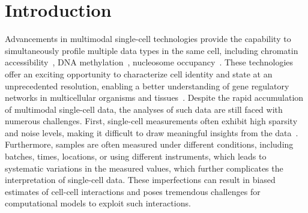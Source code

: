 \section{Introduction}
\iffalse
Advancements in multimodal single-cell technologies provide the capability to simultaneously profile multiple data types in the same cell, including chromatin accessibility~\cite{cao2018joint, chen2019high}, DNA methylation~\cite{gaiti2019epigenetic}, nucleosome occupancy~\cite{pott2017simultaneous}. For example, CITE-seq~\cite{stoeckius2017simultaneous} utilizing oligonucleotide-conjugated antibodies can quantify RNA and surface protein abundance in the same cells. Here, protein abundance is measured via the antibody-derived tags (ADTs) read counts. The Single Cell Multiome ATAC $+$ Gene Expression technology~\cite{belhocine2021single} %
concurrently profiles assay of transposase-accessible chromatin (ATAC-seq) ~\cite{buenrostro2013transposition} and RNA expression from the same cell. These technologies offer an exciting opportunity to characterize cell identity and state at an unprecedented resolution, enabling a better understanding of gene regulatory networks in multicellular organisms and tissues~\cite{zhu2020single}. 
\fi 

Advancements in multimodal single-cell technologies provide the capability to simultaneously profile multiple data types in the same cell, including chromatin accessibility~\cite{cao2018joint, chen2019high}, DNA methylation~\cite{gaiti2019epigenetic}, nucleosome occupancy~\cite{pott2017simultaneous}. These technologies offer an exciting opportunity to characterize cell identity and state at an unprecedented resolution, enabling a better understanding of gene regulatory networks in multicellular organisms and tissues~\cite{zhu2020single}.  Despite the rapid accumulation of multimodal single-cell data, the analyses of such data are still faced with numerous challenges. First, single-cell measurements often exhibit high sparsity and noise levels, making it difficult to draw meaningful insights from the data~\cite{eraslan2019single}. 
Furthermore, samples are often measured under different conditions, including batches, times, locations, or using different instruments, which leads to systematic variations in the measured values, which further complicates the interpretation of single-cell data. These imperfections can result in biased estimates of cell-cell interactions and poses tremendous challenges for computational models to exploit such interactions. 


